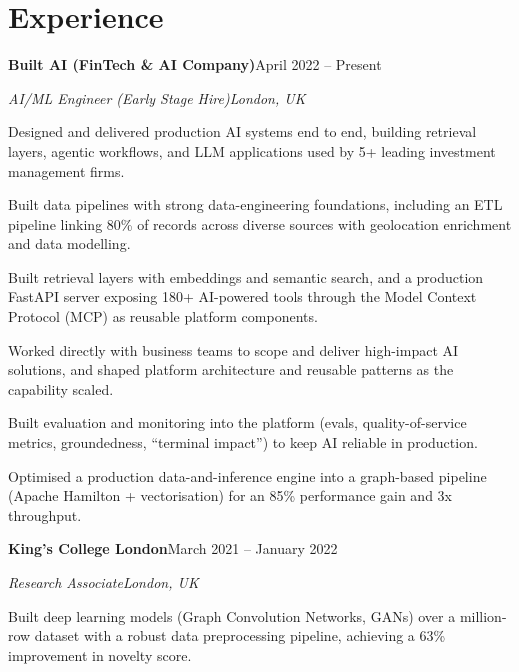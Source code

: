 \documentclass[10pt,a4paper]{article}
\newcommand{\entry}[4]{%
  {\color{company}\bfseries #1}\hfill {\color{muted}#2}\par
  \vspace{1pt}
  {\itshape #3}\hfill {\color{muted}\itshape #4}\par
  \vspace{3pt}%
}
\begin{document}
\section{Experience}
\entry{Built AI (FinTech \& AI Company)}{April 2022 -- Present}{AI/ML Engineer (Early Stage Hire)}{London, UK}
\begin{tight}
  \item Designed and delivered production AI systems end to end, building retrieval layers, agentic workflows, and LLM applications used by 5+ leading investment management firms.
  \item Built data pipelines with strong data-engineering foundations, including an ETL pipeline linking 80\% of records across diverse sources with geolocation enrichment and data modelling.
  \item Built retrieval layers with embeddings and semantic search, and a production FastAPI server exposing 180+ AI-powered tools through the Model Context Protocol (MCP) as reusable platform components.
  \item Worked directly with business teams to scope and deliver high-impact AI solutions, and shaped platform architecture and reusable patterns as the capability scaled.
  \item Built evaluation and monitoring into the platform (evals, quality-of-service metrics, groundedness, ``terminal impact'') to keep AI reliable in production.
  \item Optimised a production data-and-inference engine into a graph-based pipeline (Apache Hamilton + vectorisation) for an 85\% performance gain and 3x throughput.
\end{tight}

\entry{King's College London}{March 2021 -- January 2022}{Research Associate}{London, UK}
\begin{tight}
  \item Built deep learning models (Graph Convolution Networks, GANs) over a million-row dataset with a robust data preprocessing pipeline, achieving a 63\% improvement in novelty score.
\end{tight}

\end{document}

